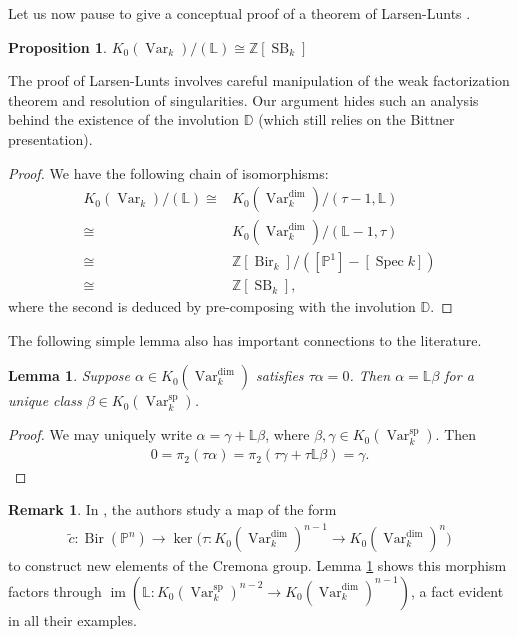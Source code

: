 \documentclass{amsart}
\newtheorem{prop}[thm]{Proposition}
\newtheorem{lem}[thm]{Lemma}
\theoremstyle{definition}
\newtheorem{rmk}[thm]{Remark}
\DeclareMathOperator{\im}{im}
\DeclareMathOperator{\Bir}{Bir}
\DeclareMathOperator{\Var}{Var}
\DeclareMathOperator{\spr}{sp}
\DeclareMathOperator{\SB}{SB}
\newcommand{\Kdim}{K_0(\Var_k^{\dim})}
\newcommand{\Kspr}{K_0(\Var_k^{\spr})}
\numberwithin{equation}{section}
\begin{document}
Let us now pause to give a conceptual proof of a theorem of Larsen-Lunts \cite{larsenluntsstable}.

\begin{prop}
$K_0(\Var_k)/(\mathbb{L}) \cong \mathbb{Z}[\SB_k]$
\end{prop}

The proof of Larsen-Lunts involves careful manipulation of the weak factorization theorem and resolution of singularities. Our argument hides such an analysis behind the existence of the involution $\mathbb{D}$ (which still relies on the Bittner presentation).

\begin{proof}
We have the following chain of isomorphisms:
\begin{align*}
    K_0(\Var_k)/(\mathbb{L}) \cong& \Kdim/(\tau-1, \mathbb{L}) \\ \cong& \Kdim/(\mathbb{L}-1,\tau) \\ \cong& \mathbb{Z}[\Bir_k]/([\mathbb{P}^1]-[\mathop{\mathrm{Spec}}k]) \\ \cong& \mathbb{Z}[\SB_k],
\end{align*}
where the second is deduced by pre-composing with the involution $\mathbb{D}$.
\end{proof}

The following simple lemma also has important connections to the literature.

\begin{lem}\label{simple lemma}
Suppose $\alpha \in \Kdim$ satisfies $\tau \alpha = 0$. Then $\alpha = \mathbb{L} \beta$ for a unique class $\beta \in \Kspr$.
\end{lem}
\begin{proof}
We may uniquely write $\alpha = \gamma + \mathbb{L} \beta$, where $\beta, \gamma \in \Kspr$. Then
\begin{align*}
    0 = \pi_2(\tau \alpha) = \pi_2(\tau \gamma + \tau \mathbb{L} \beta) = \gamma.
\end{align*}
\end{proof}

\begin{rmk}
In \cite{linshinder}, the authors study a map of the form
\begin{align*}
    \tilde{c}: \Bir(\mathbb{P}^n) \rightarrow \ker \big( \tau: \Kdim^{n-1} \rightarrow \Kdim^{n} \big)
\end{align*} 
to construct new elements of the Cremona group. Lemma \ref{simple lemma} shows this morphism factors through $\im( \mathbb{L}: \Kspr^{n-2} \rightarrow \Kdim^{n-1})$, a fact evident in all their examples.
\end{rmk}
\end{document}
